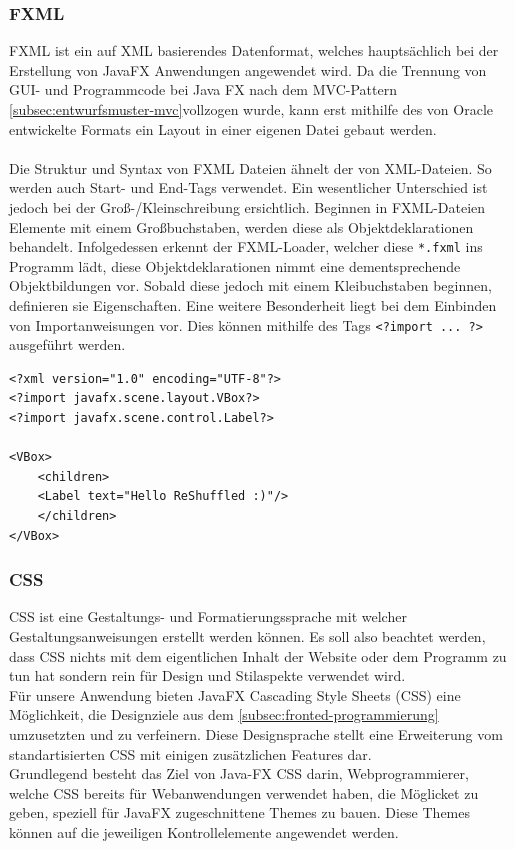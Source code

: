 \subsubsection{FXML}
FXML ist ein auf XML basierendes Datenformat, welches hauptsächlich bei der Erstellung von JavaFX Anwendungen angewendet wird.
Da die Trennung von GUI- und Programmcode bei Java FX nach dem MVC-Pattern \autoref{subsec:entwurfsmuster-mvc}vollzogen wurde, kann erst mithilfe des von Oracle entwickelte Formats ein Layout in einer eigenen Datei gebaut werden.\\\\
Die Struktur und Syntax von FXML Dateien ähnelt der von XML-Dateien.
So werden auch Start- und End-Tags verwendet.
Ein wesentlicher Unterschied ist jedoch bei der Groß-/Kleinschreibung ersichtlich.
Beginnen in FXML-Dateien Elemente mit einem Großbuchstaben, werden diese als Objektdeklarationen behandelt.
Infolgedessen erkennt der FXML-Loader, welcher diese \lstinline{*.fxml} ins Programm lädt, diese Objektdeklarationen nimmt eine dementsprechende Objektbildungen vor.
Sobald diese jedoch mit einem Kleibuchstaben beginnen, definieren sie Eigenschaften.
Eine weitere Besonderheit liegt bei dem Einbinden von Importanweisungen vor.
Dies können mithilfe des Tags \lstinline{<?import ... ?>} ausgeführt werden.\\
\begin{lstlisting}[caption=FXML-Codebeispiel,label=fxmlExample]
<?xml version="1.0" encoding="UTF-8"?>
<?import javafx.scene.layout.VBox?>
<?import javafx.scene.control.Label?>

<VBox>
    <children>
    <Label text="Hello ReShuffled :)"/>
    </children>
</VBox>
\end{lstlisting}

\subsubsection{CSS}\label{sssec:CSS}
CSS ist eine Gestaltungs- und Formatierungssprache mit welcher Gestaltungsanweisungen erstellt werden können.
Es soll also beachtet werden, dass CSS nichts mit dem eigentlichen Inhalt der Website oder dem Programm zu tun hat sondern rein für Design und Stilaspekte verwendet wird.\\
 Für unsere Anwendung bieten JavaFX Cascading Style Sheets (CSS) eine Möglichkeit, die Designziele aus dem \autoref{subsec:fronted-programmierung} umzusetzten und zu verfeinern.
Diese Designsprache stellt eine Erweiterung vom standartisierten CSS mit einigen zusätzlichen Features dar.\\
Grundlegend besteht das Ziel von Java-FX CSS darin, Webprogrammierer, welche CSS bereits für Webanwendungen verwendet haben, die Möglicket zu geben, speziell für JavaFX zugeschnittene Themes zu bauen.
Diese Themes können auf die jeweiligen Kontrollelemente angewendet werden.

